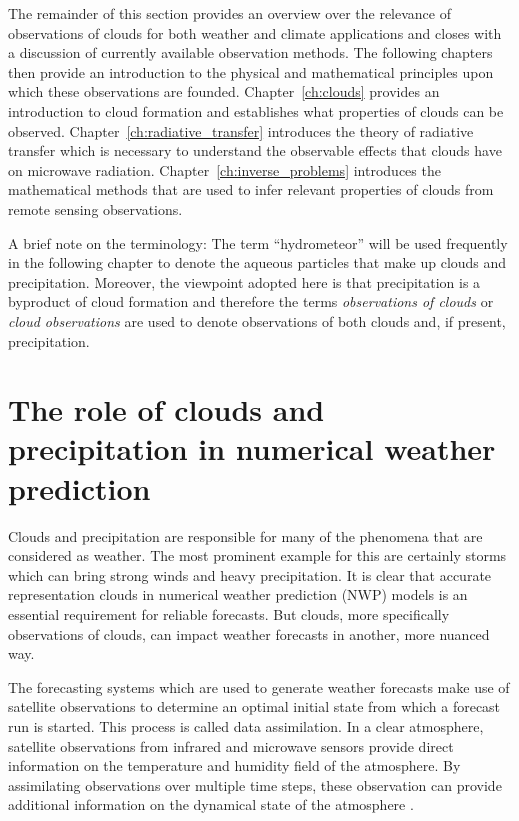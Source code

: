 The remainder of this section provides an overview over the relevance of
observations of clouds for both weather and climate applications and closes with
a discussion of currently available observation methods. The following chapters
then provide an introduction to the physical and mathematical principles upon
which these observations are founded. Chapter~\ref{ch:clouds} provides an
introduction to cloud formation and establishes what properties of clouds can be
observed. Chapter~\ref{ch:radiative_transfer} introduces the theory of radiative
transfer which is necessary to understand the observable effects that clouds
have on microwave radiation. Chapter~\ref{ch:inverse_problems} introduces the
mathematical methods that are used to infer relevant properties of clouds from
remote sensing observations.

A brief note on the terminology: The term ``hydrometeor'' will be used frequently in
the following chapter to denote the aqueous particles that make up clouds and
precipitation. Moreover, the viewpoint adopted here is that precipitation is a
byproduct of cloud formation and therefore the terms \textit{observations of
  clouds} or \textit{cloud observations} are used to denote observations of both
clouds and, if present, precipitation.

\section{The role of clouds and precipitation in numerical weather prediction}

Clouds and precipitation are responsible for many of the phenomena that are
considered as weather. The most prominent example for this are certainly storms
which can bring strong winds and heavy precipitation. It is clear that accurate
representation clouds in numerical weather prediction (NWP) models is an
essential requirement for reliable forecasts. But clouds, more specifically
observations of clouds, can impact weather forecasts in another, more nuanced
way.

The forecasting systems which are used to generate weather forecasts make use of
satellite observations to determine an optimal initial state from which a
forecast run is started. This process is called data assimilation. In a clear
atmosphere, satellite observations from infrared and microwave sensors provide
direct information on the temperature and humidity field of the atmosphere. By
assimilating observations over multiple time steps, these observation can
provide additional information on the dynamical state of the atmosphere
\cite{geer18}.

